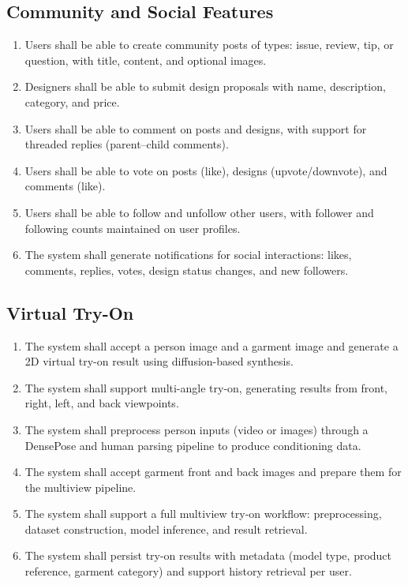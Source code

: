 \subsection{Community and Social Features}
\begin{enumerate}[leftmargin=*, label=FR-\arabic*., resume]
    \item Users shall be able to create community posts of types: issue, review, tip, or question, with title, content, and optional images.
    \item Designers shall be able to submit design proposals with name, description, category, and price.
    \item Users shall be able to comment on posts and designs, with support for threaded replies (parent--child comments).
    \item Users shall be able to vote on posts (like), designs (upvote/downvote), and comments (like).
    \item Users shall be able to follow and unfollow other users, with follower and following counts maintained on user profiles.
    \item The system shall generate notifications for social interactions: likes, comments, replies, votes, design status changes, and new followers.
\end{enumerate}

\subsection{Virtual Try-On}
\begin{enumerate}[leftmargin=*, label=FR-\arabic*., resume]
    \item The system shall accept a person image and a garment image and generate a 2D virtual try-on result using diffusion-based synthesis.
    \item The system shall support multi-angle try-on, generating results from front, right, left, and back viewpoints.
    \item The system shall preprocess person inputs (video or images) through a DensePose and human parsing pipeline to produce conditioning data.
    \item The system shall accept garment front and back images and prepare them for the multiview pipeline.
    \item The system shall support a full multiview try-on workflow: preprocessing, dataset construction, model inference, and result retrieval.
    \item The system shall persist try-on results with metadata (model type, product reference, garment category) and support history retrieval per user.
\end{enumerate}

